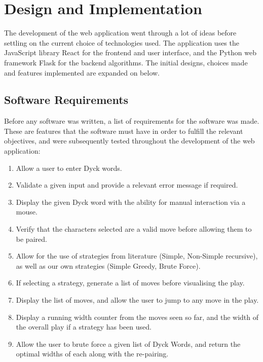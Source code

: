 \section{Design and Implementation}
The development of the web application went through a lot of ideas before settling on the current choice of technologies used. The application uses the JavaScript library React for the frontend and user interface, and the Python web framework Flask for the backend algorithms. The initial designs, choices made and features implemented are expanded on below.

\subsection{Software Requirements}
Before any software was written, a list of requirements for the software was made. These are features that the software must have in order to fulfill the relevant objectives, and were subsequently tested throughout the development of the web application:
\begin{enumerate}
    \item Allow a user to enter Dyck words.
    \item Validate a given input and provide a relevant error message if required.
    \item Display the given Dyck word with the ability for manual interaction via a mouse.
    \item Verify that the characters selected are a valid move before allowing them to be paired.
    \item Allow for the use of strategies from literature (Simple, Non-Simple recursive), as well as our own strategies (Simple Greedy, Brute Force).
    \item If selecting a strategy, generate a list of moves before visualising the play.
    \item Display the list of moves, and allow the user to jump to any move in the play.
    \item Display a running width counter from the moves seen so far, and the width of the overall play if a strategy has been used.
    \item Allow the user to brute force a given list of Dyck Words, and return the optimal widths of each along with the re-pairing.
\end{enumerate}

